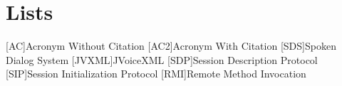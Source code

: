 \appendix
\renewcommand{\appendixtocname}{Appendix}
\renewcommand{\appendixpagename}{\appendixtocname}
\addappheadtotoc
{}
\appendixpage

\chapter{Lists}
\begin{acronym}[\hspace{3cm}]
  [AC]{Acronym Without Citation}
  [AC2]{Acronym With Citation \cite{citeKey2}}
  [SDS]{Spoken Dialog System}
  [JVXML]{JVoiceXML}
  [SDP]{Session Description Protocol}
  [SIP]{Session Initialization Protocol}
  [RMI]{Remote Method Invocation}
\end{acronym}
\clearpage
\listoffigures
{}
\lstlistoflistings
{}

